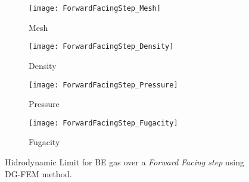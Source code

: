 \documentclass[twoside,twocolumn,prc,floats,amsmath,amssymb]{revtex4} %
\begin{document}
\begin{figure}
        \centering
        \begin{subfigure}[b]{0.45\textwidth}
                \centering
                \texttt{[image: ForwardFacingStep\_Mesh]}
                \caption{Mesh}
                \label{FFS_mesh}
        \end{subfigure}%
				
        \begin{subfigure}[b]{0.45\textwidth}
                \centering
                \texttt{[image: ForwardFacingStep\_Density]}
                \caption{Density}
                \label{fig:FFS_Density}
        \end{subfigure}
				
        \begin{subfigure}[b]{0.45\textwidth}
								\centering
                \texttt{[image: ForwardFacingStep\_Pressure]}
                \caption{Pressure}
                \label{fig:FFS_Pressure}
        \end{subfigure}
				
				\begin{subfigure}[b]{0.45\textwidth}
								\centering
                \texttt{[image: ForwardFacingStep\_Fugacity]}
                \caption{Fugacity}
                \label{fig:FFS_Fugacity}
        \end{subfigure}
				\caption{Hidrodynamic Limit for BE gas over a \emph{Forward Facing step} using DG-FEM method.}
				\label{fig:FFD_DG-FEM}
\end{figure}
\end{document}
